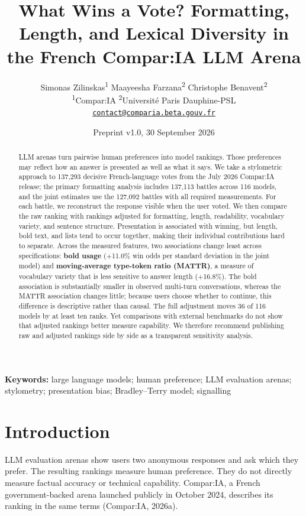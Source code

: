 \documentclass[
]{article}
\title{What Wins a Vote? Formatting, Length, and Lexical Diversity in
the French Compar:IA LLM Arena}
\author{\parbox{0.96\textwidth}{\centering
Simonas Zilinskas\textsuperscript{1} \quad Maayeesha Farzana\textsuperscript{2}
\quad Christophe Benavent\textsuperscript{2}\\[0.45em]
{\small\textsuperscript{1}Compar:IA \quad
\textsuperscript{2}Université Paris Dauphine-PSL}\\[0.45em]
\href{mailto:contact@comparia.beta.gouv.fr}{\texttt{contact@comparia.beta.gouv.fr}}}}
\date{Preprint v1.0, 30 September 2026}
\begin{document}
\maketitle

\begin{abstract}

LLM arenas turn pairwise human preferences into model rankings. Those
preferences may reflect how an answer is presented as well as what it
says. We take a stylometric approach to 137,293 decisive
French-language votes from the July 2026 Compar:IA release; the primary formatting analysis includes 137,113
battles across 116 models, and the joint estimates use the 127,092
battles with all required measurements. For each battle, we reconstruct
the response visible when the user voted. We then compare the raw
ranking with rankings adjusted for formatting, length, readability,
vocabulary variety, and sentence structure. Presentation is associated
with winning, but length, bold text, and lists tend to occur together,
making their individual contributions hard to separate. Across the
measured features, two associations change least across specifications:
\textbf{bold usage} (+11.0\% win odds per standard deviation in the joint
model) and \textbf{moving-average type-token ratio (MATTR)}, a measure of
vocabulary variety that is less sensitive to answer length (+16.8\%).
The bold association is substantially smaller in observed multi-turn
conversations, whereas the MATTR association changes little; because
users choose whether to continue, this difference is descriptive rather
than causal. The full adjustment moves 36 of 116 models by at least ten
ranks. Yet comparisons with external benchmarks do not show that
adjusted rankings better measure capability. We therefore recommend
publishing raw and adjusted rankings side by side as a transparent
sensitivity analysis.
\end{abstract}

\noindent\textbf{Keywords:} large language models; human preference;
LLM evaluation arenas; stylometry; presentation bias; Bradley--Terry
model; signalling

\section{Introduction}\label{introduction}

LLM evaluation arenas show users two anonymous responses and ask which
they prefer. The resulting rankings measure human preference. They do
not directly measure factual accuracy or technical capability.
Compar:IA, a French government-backed arena launched publicly in October
2024, describes its ranking in the same terms (Compar:IA, 2026a).
\end{document}
